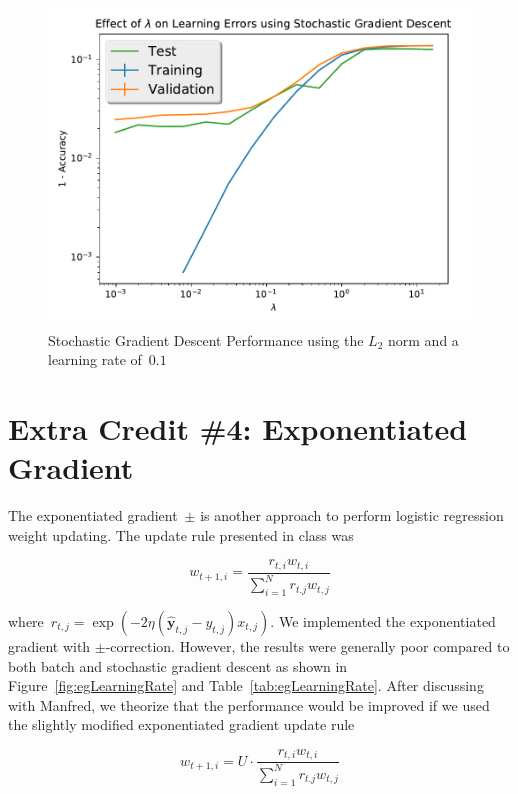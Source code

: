 \documentclass{report}
\newcommand{\yhat}{\hat{\mathbf{y}}}
\begin{document}
  \begin{figure}[tb]
    \centering
    \includegraphics[scale=.5]{stochastic_GD_L2Norm}
    \caption{Stochastic Gradient Descent Performance using the $L_{2}$ norm and a learning rate of~$0.1$}\label{fig:stochasticGDL2}
  \end{figure}
  
 
  \section{Extra Credit \#4: Exponentiated Gradient}
  
  The exponentiated gradient~$\pm$ is another approach to perform logistic regression weight updating.  The update rule presented in class was
  
  \begin{equation}
    w_{t+1,i}=\frac{r_{t,i}w_{t,i}}{\sum_{i=1}^{N}r_{t.j}w_{t,j}}
    \label{eq:exponeniatedGradient}
  \end{equation}
  
  \noindent
  where~${r_{t,j}=\exp\left(-2\eta(\yhat_{t,j}-y_{t,j})x_{t,j}\right)}$.  We implemented the exponentiated gradient with $\pm$-correction.  However, the results were generally poor compared to both batch and stochastic gradient descent as shown in Figure~\ref{fig:egLearningRate} and Table~\ref{tab:egLearningRate}.  After discussing with Manfred, we theorize that the performance would be improved if we used the slightly modified exponentiated gradient update rule
    
  \begin{equation}
    w_{t+1,i}=U\cdot\frac{r_{t,i}w_{t,i}}{\sum_{i=1}^{N}r_{t.j}w_{t,j}}
  \label{eq:exponeniatedGradientWithU}
  \end{equation}
  
\end{document}
